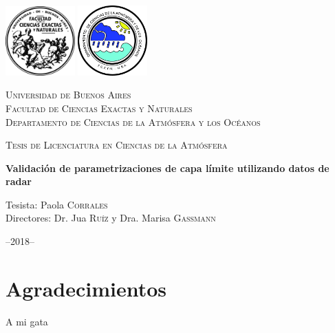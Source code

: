 \documentclass[12pt,spanish,oneside, a4paper]{book}
\title{}
\subtitle{Validación de parametrizaciones de capa límite utilizando datos de radar}
\author{Paola Corrales}
\date{}
\begin{document}
\begin{titlepage}
    \centering
    \includegraphics[width=0.2\textwidth]{logoUBA}  \hfill \includegraphics[width=0.2\textwidth]{logoDCAO} \par
    \vspace{1cm}
    {\scshape\LARGE Universidad de Buenos Aires  \\
    \large Facultad de Ciencias Exactas y Naturales \\
Departamento de Ciencias de la Atmósfera y los Océanos  \par}
    \vspace{0.5cm}
    {\scshape\Large Tesis de Licenciatura en Ciencias de la Atmósfera\par}
    \vspace{1.5cm}
    {\huge\bfseries Validación de parametrizaciones de capa límite utilizando datos de radar\par}
    \vspace{4.5cm}
    {\Large Tesista: Paola \textsc{Corrales} \\
        Directores: Dr. Jua \textsc{Ruíz} y Dra. Marisa \textsc{Gassmann}
    \par}
    \vfill

    {\large --2018--\par}
\end{titlepage}

\renewcommand{\listtablename}{Índice de tablas} 
\renewcommand{\tablename}{Tabla} 

\chapter*{Agradecimientos}

A mi gata

\newpage
\end{document}
